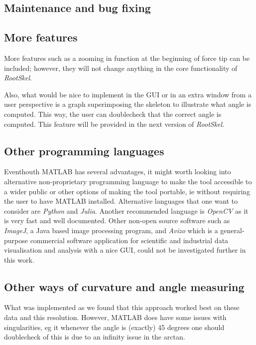 \subsection{Maintenance and bug fixing}

\subsection{More features}

More features such as a zooming in function at the beginning of force tip can be included; however, they will not change anything in the core functionality of \textit{RootSkel}.

Also, what would be nice to implement in the GUI or in an extra window from a user perspective is a graph superimposing the skeleton to illustrate what angle is computed. This way, the user can doublecheck that the correct angle is computed. This feature will be provided in the next version of \textit{RootSkel}.



\subsection{Other programming languages}

Eventhouth MATLAB has several advantages, it might worth looking into alternative non-proprietary programming language to make the tool accessible to a wider public or other options of making the tool portable, ie without requiring the user to have MATLAB installed.
Alternative languages that one want to consider are \textit{Python} and \textit{Julia}. Another recommended language is \textit{OpenCV} as it is very fast and well documented. Other non-open source software such as \textit{ImageJ}, a Java based image processing program, and \textit{Avizo} which is a general-purpose commercial software application for scientific and industrial data visualisation and analysis with a nice GUI, could not be investigated further in this work. 


\subsection{Other ways of curvature and angle measuring}

What was implemented as we found that this approach worked best on these data and this resolution. However, MATLAB does have some issues with singularities, eg it whenever the angle is (exactly) 45 degrees one should doublecheck of this is due to an infinity issue in the arctan. 

